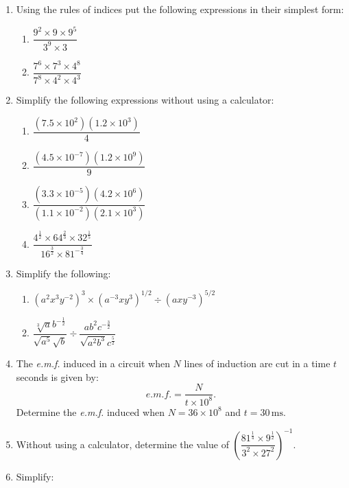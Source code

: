 \documentclass[
  12pt,
  oneside]{book}
\providecommand{\tightlist}{%
  \setlength{\itemsep}{0pt}\setlength{\parskip}{0pt}}
\theoremstyle{definition}
\theoremstyle{definition}
\theoremstyle{definition}
\theoremstyle{definition}
\theoremstyle{remark}
\begin{document}
\begin{enumerate}
\def\labelenumi{\arabic{enumi}.}
\item
  Using the rules of indices put the following expressions in their simplest form:

  \begin{enumerate}
  \def\labelenumii{\roman{enumii})}
  \tightlist
  \item
    \(\dfrac{9^2\times 9\times 9^5}{3^9\times 3}\)
  \item
    \(\dfrac{7^6\times 7^3\times 4^8}{7^8\times 4^2\times 4^3}\)
  \end{enumerate}
\item
  Simplify the following expressions without using a calculator:

  \begin{enumerate}
  \def\labelenumii{\roman{enumii})}
  \tightlist
  \item
    \(\dfrac{(7.5\times 10^2)(1.2\times 10^3)}{4}\)
  \item
    \(\dfrac{(4.5\times 10^{-7})(1.2\times 10^9)}{9}\)
  \item
    \(\dfrac{(3.3\times10^{-5})(4.2\times 10^6)}{(1.1\times10^{-2})(2.1\times 10^3)}\)
  \item
    \(\dfrac{4^{\frac12}\times 64^{\frac23}\times 32^{\frac15}}{16^{\frac32}\times 81^{-\frac34}}\)
  \end{enumerate}
\item
  Simplify the following:

  \begin{enumerate}
  \def\labelenumii{\roman{enumii})}
  \tightlist
  \item
    \((a^2 x^3 y^{-2})^3 \times (a^{-3}xy^3)^{1/2}\div (axy^{-3})^{5/2}\)
  \item
    \(\dfrac{\sqrt[3]{a}b^{-\frac12}}{\sqrt{a^5}\sqrt{b}}\div\dfrac{ab^2c^{-\frac32}}{\sqrt{a^2b^3}c^{\frac52}}\)
  \end{enumerate}
\item
  The \emph{e.m.f.} induced in a circuit when \(N\) lines of induction are cut in a time \(t\) seconds is given by:
  \[e.m.f. = \frac{N}{t\times 10^8}.\]
  Determine the \emph{e.m.f.} induced when \(N=36\times 10^8\) and \(t=30\,\mathrm{ms}\).
\item
  Without using a calculator, determine the value of \(\left(\dfrac{81^{\frac14}\times 9^{\frac12}}{3^2\times 27^2}\right)^{-1}\).
\item
  Simplify:


\end{enumerate}
\end{document}
